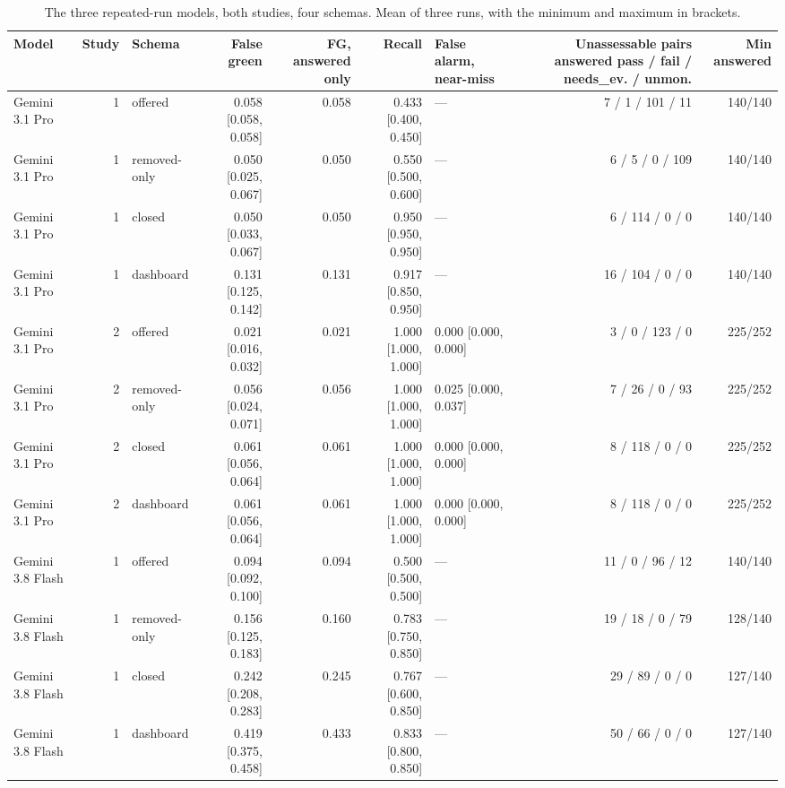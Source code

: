 \documentclass[10pt,twocolumn]{article}
\begin{document}
\begin{table}
\centering\footnotesize\setlength{\tabcolsep}{4pt}
\caption{The three repeated-run models, both studies, four schemas. Mean of three runs, with the minimum and maximum in brackets.}
\label{tab:22}
\begin{adjustbox}{max width=\textheight}
\begin{tabular}{lrlrrrlrr}
\toprule
\textbf{Model} & \textbf{Study} & \textbf{Schema} & \textbf{False green} & \textbf{FG, answered only} & \textbf{Recall} & \textbf{False alarm, near-miss} & \textbf{Unassessable pairs answered pass / fail / needs\_ev. / unmon.} & \textbf{Min answered} \\
\midrule
Gemini 3.1 Pro & 1 & offered & 0.058 [0.058, 0.058] & 0.058 & 0.433 [0.400, 0.450] & — & 7 / 1 / 101 / 11 & 140/140 \\
Gemini 3.1 Pro & 1 & removed-only & 0.050 [0.025, 0.067] & 0.050 & 0.550 [0.500, 0.600] & — & 6 / 5 / 0 / 109 & 140/140 \\
Gemini 3.1 Pro & 1 & closed & 0.050 [0.033, 0.067] & 0.050 & 0.950 [0.950, 0.950] & — & 6 / 114 / 0 / 0 & 140/140 \\
Gemini 3.1 Pro & 1 & dashboard & 0.131 [0.125, 0.142] & 0.131 & 0.917 [0.850, 0.950] & — & 16 / 104 / 0 / 0 & 140/140 \\
Gemini 3.1 Pro & 2 & offered & 0.021 [0.016, 0.032] & 0.021 & 1.000 [1.000, 1.000] & 0.000 [0.000, 0.000] & 3 / 0 / 123 / 0 & 225/252 \\
Gemini 3.1 Pro & 2 & removed-only & 0.056 [0.024, 0.071] & 0.056 & 1.000 [1.000, 1.000] & 0.025 [0.000, 0.037] & 7 / 26 / 0 / 93 & 225/252 \\
Gemini 3.1 Pro & 2 & closed & 0.061 [0.056, 0.064] & 0.061 & 1.000 [1.000, 1.000] & 0.000 [0.000, 0.000] & 8 / 118 / 0 / 0 & 225/252 \\
Gemini 3.1 Pro & 2 & dashboard & 0.061 [0.056, 0.064] & 0.061 & 1.000 [1.000, 1.000] & 0.000 [0.000, 0.000] & 8 / 118 / 0 / 0 & 225/252 \\
Gemini 3.8 Flash & 1 & offered & 0.094 [0.092, 0.100] & 0.094 & 0.500 [0.500, 0.500] & — & 11 / 0 / 96 / 12 & 140/140 \\
Gemini 3.8 Flash & 1 & removed-only & 0.156 [0.125, 0.183] & 0.160 & 0.783 [0.750, 0.850] & — & 19 / 18 / 0 / 79 & 128/140 \\
Gemini 3.8 Flash & 1 & closed & 0.242 [0.208, 0.283] & 0.245 & 0.767 [0.600, 0.850] & — & 29 / 89 / 0 / 0 & 127/140 \\
Gemini 3.8 Flash & 1 & dashboard & 0.419 [0.375, 0.458] & 0.433 & 0.833 [0.800, 0.850] & — & 50 / 66 / 0 / 0 & 127/140 \\

\end{tabular}
\end{adjustbox}
\end{table}
\end{document}
